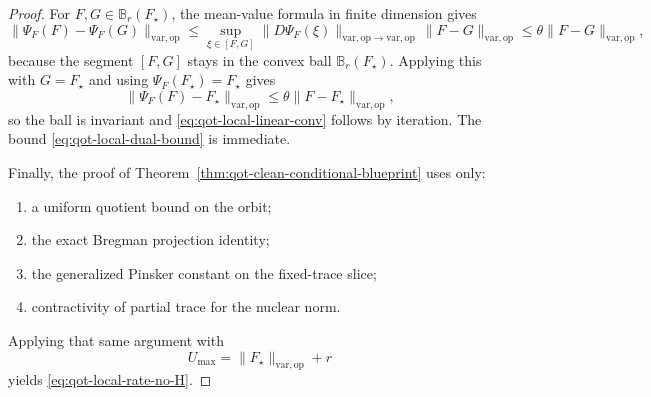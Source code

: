 \documentclass[11pt]{article}
\newcommand{\op}{\mathrm{op}}
\newcommand{\varop}{\mathrm{var},\op}
\theoremstyle{plain}
\begin{document}
\begin{proof}
For $F,G\in \mathbb B_r(F_\star)$, the mean-value formula in finite dimension gives
\[
\|\Psi_F(F)-\Psi_F(G)\|_{\varop}
\le
\sup_{\xi\in [F,G]}\|D\Psi_F(\xi)\|_{\varop\to\varop}\,\|F-G\|_{\varop}
\le
\theta\|F-G\|_{\varop},
\]
because the segment $[F,G]$ stays in the convex ball $\mathbb B_r(F_\star)$.
Applying this with $G=F_\star$ and using $\Psi_F(F_\star)=F_\star$ gives
\[
\|\Psi_F(F)-F_\star\|_{\varop}\le \theta\|F-F_\star\|_{\varop},
\]
so the ball is invariant and \eqref{eq:qot-local-linear-conv} follows by iteration.
The bound \eqref{eq:qot-local-dual-bound} is immediate.

Finally, the proof of Theorem~\ref{thm:qot-clean-conditional-blueprint} uses only:
\begin{enumerate}[label=\textnormal{(\alph*)}]
\item a uniform quotient bound on the orbit;
\item the exact Bregman projection identity;
\item the generalized Pinsker constant on the fixed-trace slice;
\item contractivity of partial trace for the nuclear norm.
\end{enumerate}
Applying that same argument with
\[
U_{\max}=\|F_\star\|_{\varop}+r
\]
yields \eqref{eq:qot-local-rate-no-H}.
\end{proof}
\end{document}
